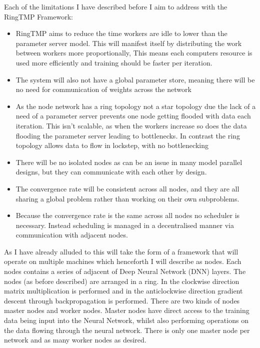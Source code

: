 Each of the limitations I have described before I aim to address with the
RingTMP Framework:
\begin{itemize}
    \item RingTMP aims to reduce the time workers are idle to lower than the
    parameter server model. This will manifest itself by distributing the work
    between workers more proportionally, This means each computers resource is
    used more efficiently and training should be faster per iteration.
    \item The system will also not have a global parameter store, meaning there
    will be no need for communication of weights across the network
    \item As the node network has a ring topology not a star topology due the
    lack of a need of a parameter server prevents one node getting flooded with
    data each iteration. This isn't scalable, as when the workers increase so
    does the data flooding the parameter server leading to bottlenecks. In
    contrast the ring topology allows data to flow in lockstep, with no
    bottlenecking
    \item There will be no isolated nodes as can be an issue in many model
    parallel designs, but they can communicate with each other by design.
    \item The convergence rate will be consistent across all nodes, and they are
    all sharing a global problem rather than working on their own subproblems.
    \item Because the convergence rate is the same across all nodes no scheduler
    is necessary. Instead scheduling is managed in a decentralised manner via
    communication with adjacent nodes.
\end{itemize}

As I have already alluded to this will take the form of a framework that will
operate on multiple machines which henceforth I will describe as nodes. Each
nodes contains a series of adjacent of Deep Neural Network (DNN) layers. The
nodes (as before described) are arranged in a ring. In the clockwise direction
matrix multiplication is performed and in the anticlockwise direction gradient
descent through backpropagation is performed. There are two kinds of nodes
master nodes and worker nodes. Master nodes have direct access to the training
data being input into the Neural Network, whilst also performing operations on
the data flowing through the neural network. There is only one master node per
network and as many worker nodes as desired. 
\par

